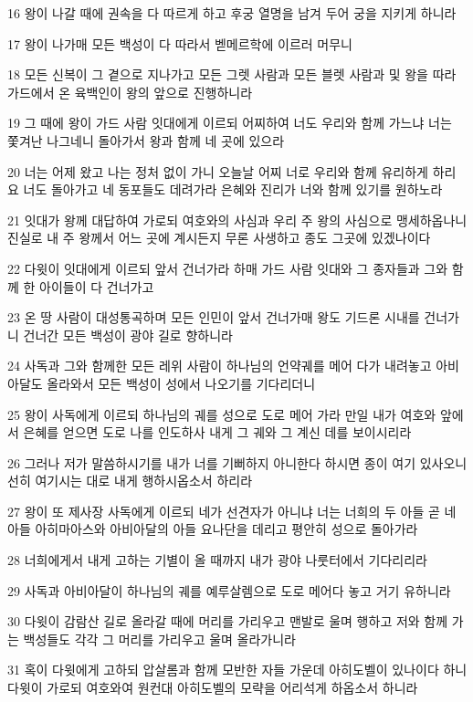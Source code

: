 \par 16 왕이 나갈 때에 권속을 다 따르게 하고 후궁 열명을 남겨 두어 궁을 지키게 하니라
\par 17 왕이 나가매 모든 백성이 다 따라서 벧메르학에 이르러 머무니
\par 18 모든 신복이 그 곁으로 지나가고 모든 그렛 사람과 모든 블렛 사람과 및 왕을 따라 가드에서 온 육백인이 왕의 앞으로 진행하니라
\par 19 그 때에 왕이 가드 사람 잇대에게 이르되 어찌하여 너도 우리와 함께 가느냐 너는 쫓겨난 나그네니 돌아가서 왕과 함께 네 곳에 있으라
\par 20 너는 어제 왔고 나는 정처 없이 가니 오늘날 어찌 너로 우리와 함께 유리하게 하리요 너도 돌아가고 네 동포들도 데려가라 은혜와 진리가 너와 함께 있기를 원하노라
\par 21 잇대가 왕께 대답하여 가로되 여호와의 사심과 우리 주 왕의 사심으로 맹세하옵나니 진실로 내 주 왕께서 어느 곳에 계시든지 무론 사생하고 종도 그곳에 있겠나이다
\par 22 다윗이 잇대에게 이르되 앞서 건너가라 하매 가드 사람 잇대와 그 종자들과 그와 함께 한 아이들이 다 건너가고
\par 23 온 땅 사람이 대성통곡하며 모든 인민이 앞서 건너가매 왕도 기드론 시내를 건너가니 건너간 모든 백성이 광야 길로 향하니라
\par 24 사독과 그와 함께한 모든 레위 사람이 하나님의 언약궤를 메어 다가 내려놓고 아비아달도 올라와서 모든 백성이 성에서 나오기를 기다리더니
\par 25 왕이 사독에게 이르되 하나님의 궤를 성으로 도로 메어 가라 만일 내가 여호와 앞에서 은혜를 얻으면 도로 나를 인도하사 내게 그 궤와 그 계신 데를 보이시리라
\par 26 그러나 저가 말씀하시기를 내가 너를 기뻐하지 아니한다 하시면 종이 여기 있사오니 선히 여기시는 대로 내게 행하시옵소서 하리라
\par 27 왕이 또 제사장 사독에게 이르되 네가 선견자가 아니냐 너는 너희의 두 아들 곧 네 아들 아히마아스와 아비아달의 아들 요나단을 데리고 평안히 성으로 돌아가라
\par 28 너희에게서 내게 고하는 기별이 올 때까지 내가 광야 나룻터에서 기다리리라
\par 29 사독과 아비아달이 하나님의 궤를 예루살렘으로 도로 메어다 놓고 거기 유하니라
\par 30 다윗이 감람산 길로 올라갈 때에 머리를 가리우고 맨발로 울며 행하고 저와 함께 가는 백성들도 각각 그 머리를 가리우고 울며 올라가니라
\par 31 혹이 다윗에게 고하되 압살롬과 함께 모반한 자들 가운데 아히도벨이 있나이다 하니 다윗이 가로되 여호와여 원컨대 아히도벨의 모략을 어리석게 하옵소서 하니라

